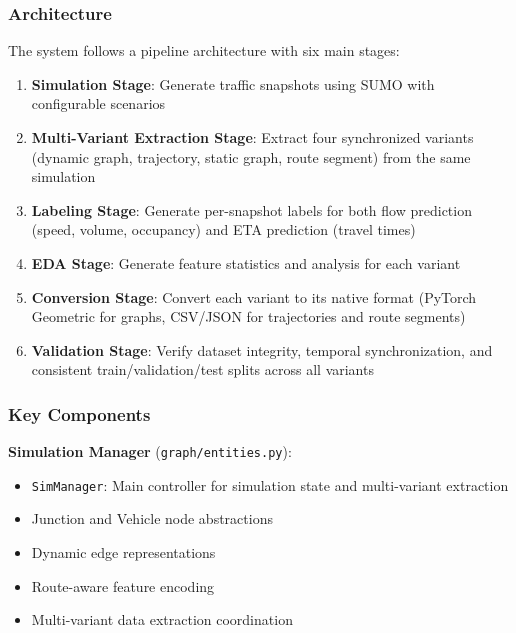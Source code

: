 \subsubsection{Architecture}

The system follows a pipeline architecture with six main stages:

\begin{enumerate}
    \item \textbf{Simulation Stage}: Generate traffic snapshots using SUMO with configurable scenarios
    \item \textbf{Multi-Variant Extraction Stage}: Extract four synchronized variants (dynamic graph, trajectory, static graph, route segment) from the same simulation
    \item \textbf{Labeling Stage}: Generate per-snapshot labels for both flow prediction (speed, volume, occupancy) and ETA prediction (travel times)
    \item \textbf{EDA Stage}: Generate feature statistics and analysis for each variant
    \item \textbf{Conversion Stage}: Convert each variant to its native format (PyTorch Geometric for graphs, CSV/JSON for trajectories and route segments)
    \item \textbf{Validation Stage}: Verify dataset integrity, temporal synchronization, and consistent train/validation/test splits across all variants
\end{enumerate}

\subsubsection{Key Components}

\textbf{Simulation Manager} (\texttt{graph/entities.py}):
\begin{itemize}
    \item \texttt{SimManager}: Main controller for simulation state and multi-variant extraction
    \item Junction and Vehicle node abstractions
    \item Dynamic edge representations
    \item Route-aware feature encoding
    \item Multi-variant data extraction coordination
\end{itemize}

